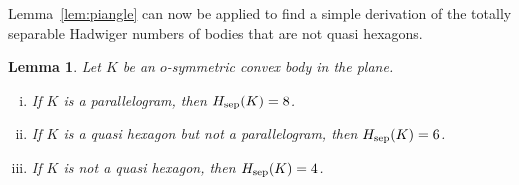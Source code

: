 \documentclass[a4paper,12pt]{article}
\theoremstyle{plain}
\newtheorem{lemma}[theorem]{Lemma}
\theoremstyle{definition}
\newcommand{\Hsep}{H_{\textnormal{sep}}}
\begin{document}
Lemma~\ref{lem:piangle} can now be applied to find a simple derivation of the totally separable Hadwiger numbers of bodies that are not quasi hexagons.

\begin{lemma}\label{lem:hsep}
 Let $K$ be an $o$-symmetric convex body in the plane.
 \begin{enumerate}[(i)]
  \item\label{item:paral} If $K$ is a parallelogram, then $\Hsep(K)=8$.
  \item\label{item:hex} If $K$ is a quasi hexagon but not a parallelogram, then 
$\Hsep(K)=6$.
  \item\label{item:nothex} If $K$ is not a quasi hexagon, then $\Hsep(K)=4$.
 \end{enumerate}
\end{lemma}
\end{document}
